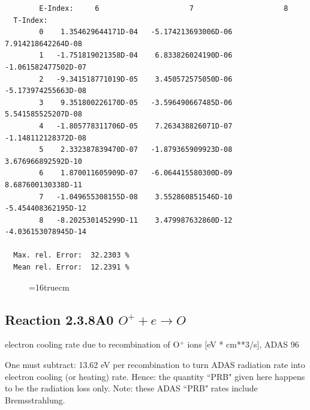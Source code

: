 \documentclass[12pt,dvipdfmx]{article}
\begin{document}
\begin{small}
\begin{verbatim}
        E-Index:     6                     7                     8
  T-Index:
        0    1.354629644171D-04   -5.174213693006D-06    7.914218642264D-08
        1   -1.751819021358D-04    6.833826024190D-06   -1.061582477502D-07
        2   -9.341518771019D-05    3.450572575050D-06   -5.173974255663D-08
        3    9.351800226170D-05   -3.596490667485D-06    5.541585525207D-08
        4   -1.805778311706D-05    7.263438826071D-07   -1.148112128372D-08
        5    2.332387839470D-07   -1.879365909923D-08    3.676966892592D-10
        6    1.870011605909D-07   -6.064415580300D-09    8.687600130338D-11
        7   -1.049655308155D-08    3.552860851546D-10   -5.454408362195D-12
        8   -8.202530145299D-11    3.479987632860D-12   -4.036153078945D-14

  Max. rel. Error:  32.2303 %
  Mean rel. Error:  12.2391 %

\end{verbatim}\end{small}
\begin{figure} \label{2.3.7rl}
\epsfxsize=16truecm 
\end{figure}
\newpage

\subsection{
  Reaction 2.3.8A0  $O^+ + e \rightarrow O   $
}
electron cooling rate due to recombination of O$^+$ ions [eV *
cm**3/s], ADAS 96

One must subtract: 13.62 eV per recombination to turn ADAS radiation
rate into electron cooling (or heating) rate. Hence: the quantity
``PRB" given here happens to be the radiation loss only. Note: these
ADAS ``PRB" rates include Bremsstrahlung.
\end{document}
